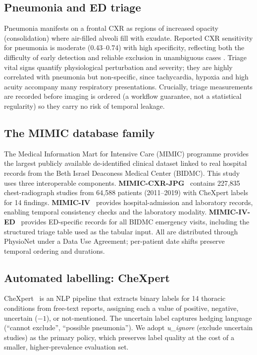 \documentclass[twocolumn, final]{svjour3}
\begin{document}
\subsection{Pneumonia and ED triage}
Pneumonia manifests on a frontal CXR as regions of increased opacity (consolidation)
where air-filled alveoli fill with exudate. Reported CXR sensitivity for pneumonia
is moderate (0.43--0.74) with high specificity, reflecting both the difficulty of
early detection and reliable exclusion in unambiguous cases \citep{metlay2019idsa}.
Triage vital signs quantify physiological perturbation and severity; they are highly
correlated with pneumonia but non-specific, since tachycardia, hypoxia and high
acuity accompany many respiratory presentations. Crucially, triage measurements are
recorded before imaging is ordered (a workflow guarantee, not a statistical
regularity) so they carry no risk of temporal leakage.

\subsection{The MIMIC database family}
The Medical Information Mart for Intensive Care (MIMIC) programme provides the
largest publicly available de-identified clinical dataset linked to real hospital
records from the Beth Israel Deaconess Medical Center (BIDMC). This study uses three
interoperable components. \textbf{MIMIC-CXR-JPG}~\citep{johnson2019mimiccxr} contains
227{,}835 chest-radiograph studies from 64{,}588 patients (2011--2019) with CheXpert
labels for 14 findings. \textbf{MIMIC-IV}~\citep{johnson2023mimiciv} provides
hospital-admission and laboratory records, enabling temporal consistency checks and
the laboratory modality. \textbf{MIMIC-IV-ED}~\citep{johnson2023mimicived} provides
ED-specific records for all BIDMC emergency visits, including the structured triage
table used as the tabular input. All are distributed through PhysioNet under a Data
Use Agreement; per-patient date shifts preserve temporal ordering and durations.

\subsection{Automated labelling: CheXpert}
CheXpert~\citep{irvin2019chexpert} is an NLP pipeline that extracts binary labels for
14 thoracic conditions from free-text reports, assigning each a value of positive,
negative, uncertain ($-1$), or not-mentioned. The uncertain label captures hedging
language (``cannot exclude'', ``possible pneumonia''). We adopt \emph{u\_ignore}
(exclude uncertain studies) as the primary policy, which preserves label quality at
the cost of a smaller, higher-prevalence evaluation set.
\end{document}
